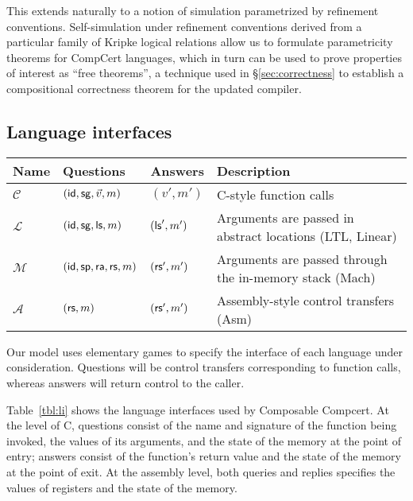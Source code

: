 This extends naturally to a notion of simulation
parametrized by refinement conventions.
Self-simulation under refinement conventions
derived from a particular family of Kripke logical relations
allow us to formulate parametricity theorems for CompCert languages,
which in turn can be used to prove properties of interest
as ``free theorems'',
a technique used in \S\ref{sec:correctness} to
establish a compositional correctness theorem
for the updated compiler.

\subsection{Language interfaces} %
\label{sec:langint}

\begin{table*} %
  \begin{tabular}{llll}
    \hline
    Name & Questions & Answers & Description \\
    \hline
    $\mathcal{C}$ & $( \mathsf{id} ,  \mathsf{sg} , \vec{v}, m)$ & $(v', m')$ &
      C-style function calls \\
    $\mathcal{L}$ & $( \mathsf{id} ,  \mathsf{sg} ,  \mathsf{ls} , m)$ & $( \mathsf{ls} ', m')$ &
      Arguments are passed in abstract locations (LTL, Linear) \\
    $\mathcal{M}$ & $( \mathsf{id} ,  \mathsf{sp} , \mathsf{ra} , \mathsf{rs} , m)$ & $( \mathsf{rs} ', m')$ &
      Arguments are passed through the in-memory stack (Mach) \\
    $\mathcal{A}$ & $( \mathsf{rs} , m)$ & $( \mathsf{rs} ', m')$ &
      Assembly-style control transfers (Asm) \\
    \hline
  \end{tabular}
  \caption{Language interfaces for the various Compcert intermediate languages.}
  \label{tbl:li}
\end{table*}

Our model uses elementary games to specify the interface
of each language under consideration.
Questions will be control transfers corresponding to function calls,
whereas answers will return control to the caller.

Table~\ref{tbl:li}
shows the language interfaces used by Composable Compcert.
At the level of C,
questions consist of
the name and signature of the function being invoked,
the values of its arguments,
and the state of the memory at the point of entry;
answers
consist of the function's return value
and the state of the memory at the point of exit.
At the assembly level,
both queries and replies specifies
the values of registers and the state of the memory.

